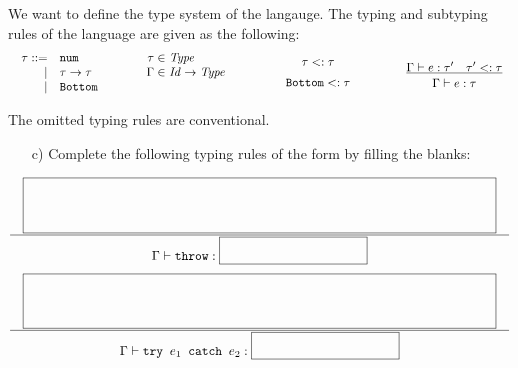 \begin{enumerate}
We want to define the type system of the langauge.
The typing and subtyping rules of the language are given as the following:
\[
\begin{array}{ccccccc}
\begin{array}{rllr@{\hskip3pt}l}
\tau::= & \verb+num+&\qquad&\tau\in&\mathit{Type} \\
\mid& \tau\rightarrow\tau &&\Gamma\in&\mathit{Id}\rightarrow\mathit{Type}\\
\mid& \verb+Bottom+ \\
\end{array} &\qquad&
\begin{array}{c}
{\tau}<:{\tau} \\[5pt]
{\code{Bottom}}<:{\tau}
\end{array}&\qquad&
\newinfrule
{ \typed{e}{\tau'} \rulesep {\tau'}<:{\tau} }
{ \typed{e}{\tau} }
\end{array}
\]

The omitted typing rules are conventional.

\begin{itemize}
\item[c)] Complete the following typing rules
of the form 
by filling the blanks:
\end{itemize}

{
\[
\newinfrule
{ \lblank }
{ \typed{\code{throw}}{\sblank} }
\]
\[
\newinfrule
{ \lblank }
{ \typed{\code{try }e_1\code{ catch }e_2}{\sblank} }
\]
}
\end{enumerate}
